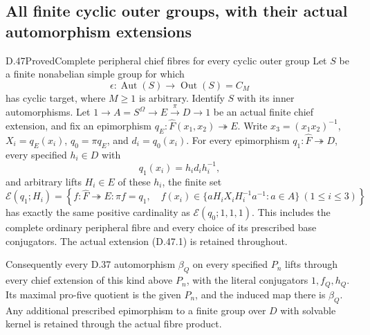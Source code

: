 \subsection{All finite cyclic outer groups, with their actual automorphism extensions}

\begin{statement}{D.47}{Proved}{Complete peripheral chief fibres for every cyclic outer group}
Let \(S\) be a finite nonabelian simple group for which
\[
 \epsilon:\operatorname{Aut}(S)\longrightarrow
       \operatorname{Out}(S)=C_M
 \tag{D.47.1}
\]
has cyclic target, where \(M\geq1\) is arbitrary.
Identify \(S\) with its inner automorphisms.
Let \(1\to A=S^\Omega\to E\xrightarrow{\pi}D\to1\)
be an actual finite chief extension, and fix an epimorphism
\(q_E:\widehat F(x_1,x_2)\twoheadrightarrow E\).
Write \(x_3=(x_1x_2)^{-1}\),
\(X_i=q_E(x_i)\), \(q_0=\pi q_E\), and \(d_i=q_0(x_i)\).
For every epimorphism \(q_1:\widehat F\twoheadrightarrow D\),
every specified \(h_i\in D\) with
\[
                    q_1(x_i)=h_id_ih_i^{-1},
 \tag{D.47.2}
\]
and arbitrary lifts \(H_i\in E\) of these \(h_i\), the finite set
\[
 \mathcal E(q_1;H_i)=
 \left\{f:\widehat F\twoheadrightarrow E:
   \pi f=q_1,\quad
   f(x_i)\in\{aH_iX_iH_i^{-1}a^{-1}:a\in A\}
                 \ (1\leq i\leq3)\right\}
 \tag{D.47.3}
\]
has exactly the same positive cardinality as
\(\mathcal E(q_0;1,1,1)\).
This includes the complete ordinary peripheral fibre and every
choice of its prescribed base conjugators.
The actual extension \textup{(D.47.1)} is retained throughout.

Consequently every D.37 automorphism \(\beta_Q\) on every
specified \(P_n\) lifts through every chief extension of this
kind above \(P_n\), with the literal conjugators
\(1,f_Q,h_Q\). Its maximal pro-five quotient is the given
\(P_n\), and the induced map there is \(\beta_Q\).
Any additional prescribed epimorphism to a finite group over
\(D\) with solvable kernel is retained through the actual
fibre product.
\end{statement}


